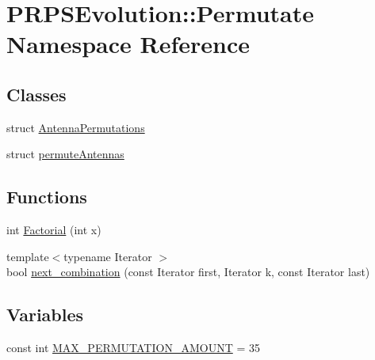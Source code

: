 \hypertarget{namespace_p_r_p_s_evolution_1_1_permutate}{\section{\-P\-R\-P\-S\-Evolution\-:\-:\-Permutate \-Namespace \-Reference}
\label{namespace_p_r_p_s_evolution_1_1_permutate}
}
\subsection*{\-Classes}
\begin{DoxyCompactItemize}
\item 
struct \hyperlink{struct_p_r_p_s_evolution_1_1_permutate_1_1_antenna_permutations}{\-Antenna\-Permutations}
\item 
struct \hyperlink{struct_p_r_p_s_evolution_1_1_permutate_1_1permute_antennas}{permute\-Antennas}
\end{DoxyCompactItemize}
\subsection*{\-Functions}
\begin{DoxyCompactItemize}
\item 
int \hyperlink{namespace_p_r_p_s_evolution_1_1_permutate_aa96780e3417667e0b15cf148d3969b5c}{\-Factorial} (int x)
\item 
{\footnotesize template$<$typename Iterator $>$ }\\bool \hyperlink{namespace_p_r_p_s_evolution_1_1_permutate_af624d98204d3a1a087581358354634c3}{next\-\_\-combination} (const \-Iterator first, \-Iterator k, const \-Iterator last)
\end{DoxyCompactItemize}
\subsection*{\-Variables}
\begin{DoxyCompactItemize}
\item 
const int \hyperlink{namespace_p_r_p_s_evolution_1_1_permutate_a11c56bc21699001cd4ee0afd5d07c7d9}{\-M\-A\-X\-\_\-\-P\-E\-R\-M\-U\-T\-A\-T\-I\-O\-N\-\_\-\-A\-M\-O\-U\-N\-T} = 35
\end{DoxyCompactItemize}


